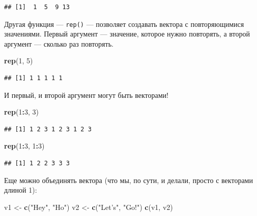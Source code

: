 \documentclass[]{book}
\newenvironment{Shaded}{\begin{snugshade}}{\end{snugshade}}
\newcommand{\KeywordTok}[1]{\textcolor[rgb]{0.13,0.29,0.53}{\textbf{#1}}}
\newcommand{\DecValTok}[1]{\textcolor[rgb]{0.00,0.00,0.81}{#1}}
\newcommand{\StringTok}[1]{\textcolor[rgb]{0.31,0.60,0.02}{#1}}
\newcommand{\OperatorTok}[1]{\textcolor[rgb]{0.81,0.36,0.00}{\textbf{#1}}}
\newcommand{\NormalTok}[1]{#1}
\begin{document}
\begin{verbatim}
## [1]  1  5  9 13
\end{verbatim}

Другая функция --- \texttt{rep()} --- позволяет создавать вектора с
повторяющимися значениями. Первый аргумент --- значение, которое нужно
повторять, а второй аргумент --- сколько раз повторять.

\begin{Shaded}
\begin{Highlighting}[]
\KeywordTok{rep}\NormalTok{(}\DecValTok{1}\NormalTok{, }\DecValTok{5}\NormalTok{)}
\end{Highlighting}
\end{Shaded}

\begin{verbatim}
## [1] 1 1 1 1 1
\end{verbatim}

И первый, и второй аргумент могут быть векторами!

\begin{Shaded}
\begin{Highlighting}[]
\KeywordTok{rep}\NormalTok{(}\DecValTok{1}\OperatorTok{:}\DecValTok{3}\NormalTok{, }\DecValTok{3}\NormalTok{)}
\end{Highlighting}
\end{Shaded}

\begin{verbatim}
## [1] 1 2 3 1 2 3 1 2 3
\end{verbatim}

\begin{Shaded}
\begin{Highlighting}[]
\KeywordTok{rep}\NormalTok{(}\DecValTok{1}\OperatorTok{:}\DecValTok{3}\NormalTok{, }\DecValTok{1}\OperatorTok{:}\DecValTok{3}\NormalTok{)}
\end{Highlighting}
\end{Shaded}

\begin{verbatim}
## [1] 1 2 2 3 3 3
\end{verbatim}

Еще можно объединять вектора (что мы, по сути, и делали, просто с
векторами длиной 1):

\begin{Shaded}
\begin{Highlighting}[]
\NormalTok{v1 <-}\StringTok{ }\KeywordTok{c}\NormalTok{(}\StringTok{"Hey"}\NormalTok{, }\StringTok{"Ho"}\NormalTok{)}
\NormalTok{v2 <-}\StringTok{ }\KeywordTok{c}\NormalTok{(}\StringTok{"Let's"}\NormalTok{, }\StringTok{"Go!"}\NormalTok{)}
\KeywordTok{c}\NormalTok{(v1, v2)}
\end{Highlighting}
\end{Shaded}
\end{document}
